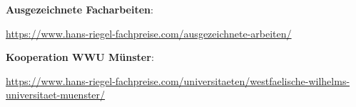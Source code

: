 \documentclass[11pt, a4paper, oneside, openright]{article}
\begin{document}
\vspace{1em}

\noindent
\textbf{Ausgezeichnete Facharbeiten}:

\begin{center}
    \url{https://www.hans-riegel-fachpreise.com/ausgezeichnete-arbeiten/}
\end{center}

\vspace{1em}

\noindent
\textbf{Kooperation WWU Münster}:

\begin{center}
    \url{https://www.hans-riegel-fachpreise.com/universitaeten/westfaelische-wilhelms-universitaet-muenster/}
\end{center}
\end{document}
